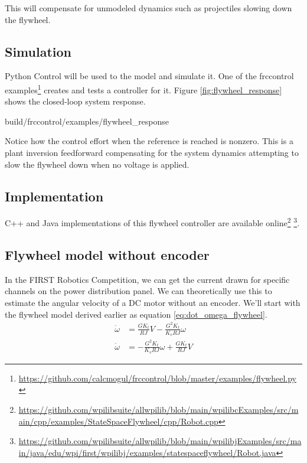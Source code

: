 This will compensate for unmodeled dynamics such as projectiles slowing down the
flywheel.

\subsection{Simulation}

Python Control will be used to  the
\gls{model} and simulate it. One of the frccontrol
examples\footnote{\url{https://github.com/calcmogul/frccontrol/blob/master/examples/flywheel.py}}
creates and tests a controller for it. Figure \ref{fig:flywheel_response} shows
the closed-loop \gls{system} response.
\begin{svg}{build/frccontrol/examples/flywheel_response}
  \caption{Flywheel response}
  \label{fig:flywheel_response}
\end{svg}

Notice how the \gls{control effort} when the \gls{reference} is reached is
nonzero. This is a plant inversion feedforward compensating for the \gls{system}
dynamics attempting to slow the flywheel down when no voltage is applied.

\subsection{Implementation}

C++ and Java implementations of this flywheel controller are available
online\footnote{\url{https://github.com/wpilibsuite/allwpilib/blob/main/wpilibcExamples/src/main/cpp/examples/StateSpaceFlywheel/cpp/Robot.cpp}}
\footnote{\url{https://github.com/wpilibsuite/allwpilib/blob/main/wpilibjExamples/src/main/java/edu/wpi/first/wpilibj/examples/statespaceflywheel/Robot.java}}.

\subsection{Flywheel model without encoder}

In the FIRST Robotics Competition, we can get the current drawn for specific
channels on the power distribution panel. We can theoretically use this to
estimate the angular velocity of a DC motor without an encoder. We'll start with
the flywheel model derived earlier as equation \eqref{eq:dot_omega_flywheel}.
\begin{align*}
  \dot{\omega} &= \frac{G K_t}{RJ} V - \frac{G^2 K_t}{K_v RJ} \omega \\
  \dot{\omega} &= -\frac{G^2 K_t}{K_v RJ} \omega + \frac{G K_t}{RJ} V
\end{align*}

